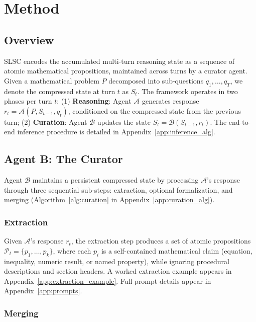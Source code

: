\section{Method}\label{sec:method}

\subsection{Overview}\label{sec:overview}

SLSC encodes the accumulated multi-turn reasoning state as a sequence of atomic mathematical propositions, maintained across turns by a curator agent. Given a mathematical problem $P$ decomposed into sub-questions $q_1, \ldots, q_T$, we denote the compressed state at turn $t$ as $S_t$. The framework operates in two phases per turn $t$: (1) \textbf{Reasoning}: Agent $\mathcal{A}$ generates response $r_t = \mathcal{A}(P, S_{t-1}, q_t)$, conditioned on the compressed state from the previous turn; (2) \textbf{Curation}: Agent $\mathcal{B}$ updates the state $S_t = \mathcal{B}(S_{t-1}, r_t)$. The end-to-end inference procedure is detailed in Appendix~\ref{app:inference_alg}.

\subsection{Agent B: The Curator}\label{sec:agent_b}

Agent $\mathcal{B}$ maintains a persistent compressed state by processing $\mathcal{A}$'s response through three sequential sub-steps: extraction, optional formalization, and merging (Algorithm~\ref{alg:curation} in Appendix~\ref{app:curation_alg}).

\subsubsection{Extraction}

Given $\mathcal{A}$'s response $r_t$, the extraction step produces a set of atomic propositions $\mathcal{P}_t = \{p_1, \ldots, p_k\}$, where each $p_i$ is a self-contained mathematical claim (equation, inequality, numeric result, or named property), while ignoring procedural descriptions and section headers. A worked extraction example appears in Appendix~\ref{app:extraction_example}. Full prompt details appear in Appendix~\ref{app:prompts}.

\subsubsection{Merging}

